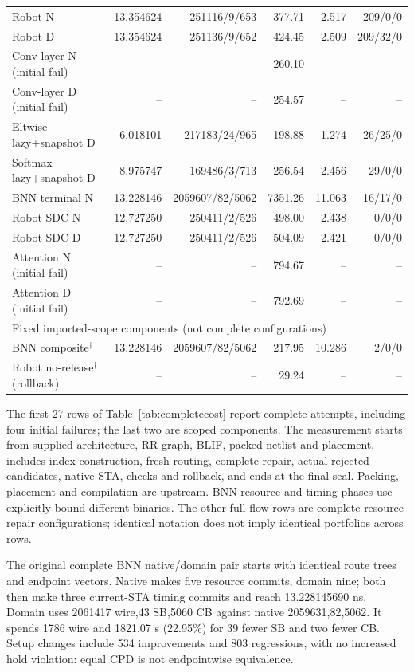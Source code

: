 \documentclass[conference,10pt]{IEEEtran}
\begin{document}
\begin{table}[t]
\begin{tabular}{lrrrrr}
Robot N&13.354624&251116/9/653&377.71&2.517&209/0/0\\
Robot D&13.354624&251136/9/652&424.45&2.509&209/32/0\\
Conv-layer N (initial fail)&--&--&260.10&--&--\\
Conv-layer D (initial fail)&--&--&254.57&--&--\\
Eltwise lazy+snapshot D&6.018101&217183/24/965&198.88&1.274&26/25/0\\
Softmax lazy+snapshot D&8.975747&169486/3/713&256.54&2.456&29/0/0\\\hline
BNN terminal N&13.228146&2059607/82/5062&7351.26&11.063&16/17/0\\
Robot SDC N&12.727250&250411/2/526&498.00&2.438&0/0/0\\
Robot SDC D&12.727250&250411/2/526&504.09&2.421&0/0/0\\
Attention N (initial fail)&--&--&794.67&--&--\\
Attention D (initial fail)&--&--&792.69&--&--\\\hline
\multicolumn{6}{l}{Fixed imported-scope components (not complete configurations)}\\
BNN composite$^{\dagger}$&13.228146&2059607/82/5062&217.95&10.286&2/0/0\\
Robot no-release$^{\dagger}$ (rollback)&--&--&29.24&--&--\\\hline
\end{tabular}
\end{table}


The first 27 rows of Table~\ref{tab:completecost} report complete attempts, including four initial failures; the last two are scoped components. The measurement starts from supplied architecture, RR graph, BLIF, packed netlist and placement, includes index construction, fresh routing, complete repair, actual rejected candidates, native STA, checks and rollback, and ends at the final seal. Packing, placement and compilation are upstream. BNN resource and timing phases use explicitly bound different binaries. The other full-flow rows are complete resource-repair configurations; identical notation does not imply identical portfolios across rows.

The original complete BNN native/domain pair starts with identical route trees and endpoint vectors. Native makes five resource commits, domain nine; both then make three current-STA timing commits and reach 13.228145690 ns. Domain uses 2061417 wire,43 SB,5060 CB against native 2059631,82,5062. It spends 1786 wire and 1821.07 s (22.95\%) for 39 fewer SB and two fewer CB. Setup changes include 534 improvements and 803 regressions, with no increased hold violation: equal CPD is not endpointwise equivalence.
\end{document}
